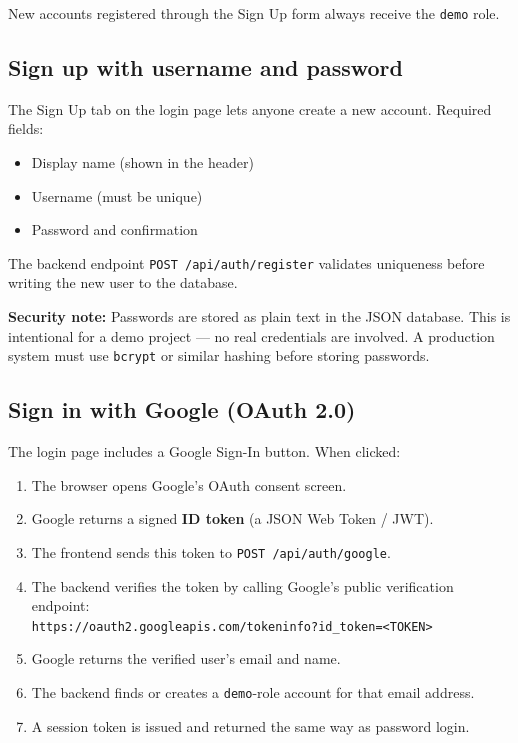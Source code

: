 \documentclass[12pt,a4paper]{article}
\begin{document}
New accounts registered through the Sign Up form always receive the \texttt{demo} role.

\subsection{Sign up with username and password}

The Sign Up tab on the login page lets anyone create a new account. Required fields:
\begin{itemize}
  \item Display name (shown in the header)
  \item Username (must be unique)
  \item Password and confirmation
\end{itemize}

The backend endpoint \texttt{POST /api/auth/register} validates uniqueness before writing the new user to the database.

\begin{warnbox}
\textbf{Security note:} Passwords are stored as plain text in the JSON database. This is intentional for a demo project — no real credentials are involved. A production system must use \texttt{bcrypt} or similar hashing before storing passwords.
\end{warnbox}

\subsection{Sign in with Google (OAuth 2.0)}

The login page includes a Google Sign-In button. When clicked:

\begin{enumerate}
  \item The browser opens Google's OAuth consent screen.
  \item Google returns a signed \textbf{ID token} (a JSON Web Token / JWT).
  \item The frontend sends this token to \texttt{POST /api/auth/google}.
  \item The backend verifies the token by calling Google's public verification endpoint: \\ \texttt{https://oauth2.googleapis.com/tokeninfo?id\_token=<TOKEN>}
  \item Google returns the verified user's email and name.
  \item The backend finds or creates a \texttt{demo}-role account for that email address.
  \item A session token is issued and returned the same way as password login.
\end{enumerate}
\end{document}
